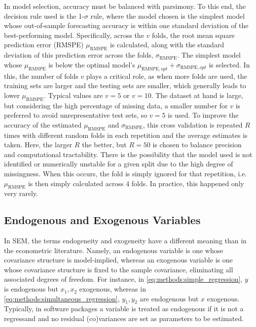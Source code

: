 In model selection, accuracy must be balanced with parsimony. To this end, the decision rule used is the 1-$\sigma$ rule,
where the model chosen is the simplest model whose out-of-sample forecasting accuracy is within one standard deviation
of the best-performing model. Specifically, across the $v$ folds, the root mean square prediction error (RMSPE)
$\mu_{\text{RMSPE}}$ is calculated, along with the standard deviation of this prediction error across the folds,
$\sigma_{\text{RMSPE}}$. The simplest model whose $\mu_{\text{RMSPE}}$ is below the optimal model's
$\mu_{\text{RMSPE},opt} + \sigma_{\text{RMSPE},opt}$ is selected.
In this, the number of folds $v$ plays a critical role, as when more folds are used, the training sets are larger
and the testing sets are smaller, which generally leads to lower $\mu_{\text{RMSPE}}$. Typical values are $v = 5$ or
$v = 10$. The dataset at hand is large, but considering the high percentage of missing data, a smaller number for
$v$ is preferred to avoid unrepresentative test sets, so $v = 5$ is used.
To improve the accuracy of the estimated $\mu_{\text{RMSPE}}$ and $\sigma_{\text{RMSPE}}$, this cross validation
is repeated $R$ times with different random folds in each repetition and the average estimates is taken.
Here, the larger $R$ the better, but $R = 50$ is chosen to balance precision and computational tractability.
There is the possibility that the model used is not identified or numerically unstable for a given split due to the high
degree of missingness. When this occurs, the fold is simply ignored for that repetition, i.e. $\mu_{\text{RMSPE}}$ is then
simply calculated across 4 folds. In practice, this happened only very rarely.

\subsection{Endogenous and Exogenous Variables}
\label{sec:methods:endo_exo}
In SEM, the terms endogeneity and exogeneity have a different meaning than in the econometric literature.
Namely, an endogenous variable is one whose covariance structure is model-implied, whereas an exogenous variable is one
whose covariance structure is fixed to the sample covariance, eliminating all associated degrees of freedom.
For instance, in \cref{eq:methods:simple_regression}, $y$ is endogenous but $x_1, x_2$ exogenous, whereas in
\cref{eq:methods:simultaneous_regression}, $y_1, y_2$ are endogenous but $x$ exogenous.
Typically, in software packages a variable is treated as endogenous if it is not a regressand and no residual (co)variances
are set as parameters to be estimated.

